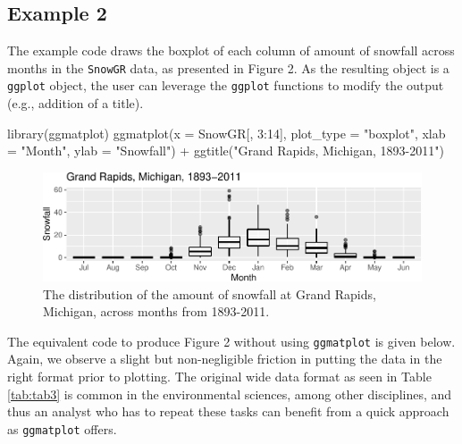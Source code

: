 \documentclass[10pt,a4paper,onecolumn]{article}
\newenvironment{Shaded}{\begin{snugshade}}{\end{snugshade}}
\newcommand{\AttributeTok}[1]{\textcolor[rgb]{0.77,0.63,0.00}{#1}}
\newcommand{\DecValTok}[1]{\textcolor[rgb]{0.00,0.00,0.81}{#1}}
\newcommand{\FunctionTok}[1]{\textcolor[rgb]{0.00,0.00,0.00}{#1}}
\newcommand{\NormalTok}[1]{#1}
\newcommand{\SpecialCharTok}[1]{\textcolor[rgb]{0.00,0.00,0.00}{#1}}
\newcommand{\StringTok}[1]{\textcolor[rgb]{0.31,0.60,0.02}{#1}}
\begin{document}
\hypertarget{example-2}{%
\subsection{Example 2}\label{example-2}}

The example code draws the boxplot of each column of amount of snowfall
across months in the \texttt{SnowGR} data, as presented in Figure 2. As
the resulting object is a \texttt{ggplot} object, the user can leverage
the \texttt{ggplot} functions to modify the output (e.g., addition of a
title).

\begin{Shaded}
\begin{Highlighting}[]
\FunctionTok{library}\NormalTok{(ggmatplot)}
\FunctionTok{ggmatplot}\NormalTok{(}\AttributeTok{x =}\NormalTok{ SnowGR[, }\DecValTok{3}\SpecialCharTok{:}\DecValTok{14}\NormalTok{], }\AttributeTok{plot\_type =} \StringTok{"boxplot"}\NormalTok{,}
          \AttributeTok{xlab =} \StringTok{"Month"}\NormalTok{,  }\AttributeTok{ylab =} \StringTok{"Snowfall"}\NormalTok{) }\SpecialCharTok{+} 
          \FunctionTok{ggtitle}\NormalTok{(}\StringTok{"Grand Rapids, Michigan, 1893{-}2011"}\NormalTok{)}
\end{Highlighting}
\end{Shaded}

\begin{figure}
\centering
\includegraphics{paper_files/figure-latex/matplot3-1.pdf}
\caption{The distribution of the amount of snowfall at Grand Rapids,
Michigan, across months from 1893-2011.}
\end{figure}

The equivalent code to produce Figure 2 without using \texttt{ggmatplot}
is given below. Again, we observe a slight but non-negligible friction
in putting the data in the right format prior to plotting. The original
wide data format as seen in Table \ref{tab:tab3} is common in the
environmental sciences, among other disciplines, and thus an analyst who
has to repeat these tasks can benefit from a quick approach as
\texttt{ggmatplot} offers.
\end{document}
